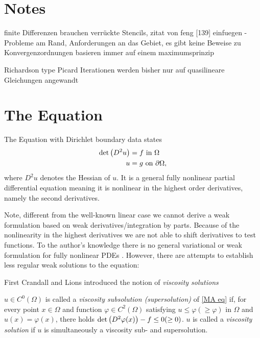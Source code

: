 \section{Notes}
finite Differenzen brauchen verrückte Stencils, zitat von feng [139] einfuegen - Probleme am Rand, Anforderungen an das Gebiet, es gibt keine Beweise zu Konvergenzordnungen
basieren immer auf einem maximumsprinzip

Richardson type Picard Iterationen werden bisher nur auf quasilineare Gleichungen angewandt


\section{The \MA Equation}

The \MA Equation with Dirichlet boundary data states
\begin{align}
	 \det{\left(D^2 u\right)} &= f \textnormal{ in } \Omega \label{MA eq}\\
	 u & = g \textnormal{ on } \partial \Omega,
\end{align}
where $D^2 u$ denotes the Hessian of $u$.
It is a general fully nonlinear partial differential equation meaning it is nonlinear in the highest order derivatives, namely the second derivatives.

Note, different from the well-known linear case we cannot derive a weak formulation based on weak derivatives/integration by parts. Because of the nonlinearity in the highest derivatives we are not able to shift derivatives to test functions. To the author's knowledge there is no general variational or weak formulation for fully nonlinear PDEs \cite{FGN2013}.
However, there are attempts to establish less regular weak solutions to the \MA equation:

First Crandall and Lions \cite{CL1983} introduced the notion of \emph{viscosity solutions}
\begin{definition}
	$u \in C^0(\Omega)$ is called a \emph{viscosity subsolution (supersolution)} of \eqref{MA eq} if, for every point $x \in \Omega$ and function $\varphi \in C^2(\Omega)$ satisfying $u \leq \varphi (\geq \varphi)$ in $\Omega$ and $u(x) = \varphi(x)$, there holds $\det{\left(D^2 \varphi(x)\right)} - f \leq 0 (\geq 0)$. 
	$u$ is called a \emph{viscosity solution} if $u$ is simultaneously a viscosity sub- and supersolution.
\end{definition}

